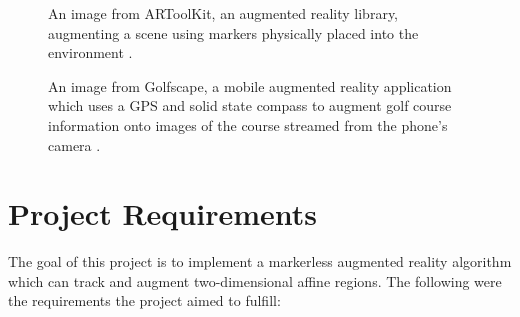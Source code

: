 \documentclass[oneside,11pt]{Latex/Classes/PhDthesisPSnPDF}
\begin{document}
\begin{figure}[h!]
  \caption{\label{fig_artoolkit_example} An image from ARToolKit, an augmented reality library, augmenting a scene using markers physically placed into the environment \cite{artoolkit_11}.}
\end{figure}

\begin{figure}[h!]
  \caption{\label{fig_golfscape_example} An image from Golfscape, a mobile augmented reality application which uses a GPS and solid state compass to augment golf course information onto images of the course streamed from the phone's camera \cite{golfscape_10}.} 
\end{figure}

\section{Project Requirements}

The goal of this project is to implement a markerless augmented reality algorithm which can track and augment two-dimensional affine regions.  The following were the requirements the project aimed to fulfill:
\end{document}
